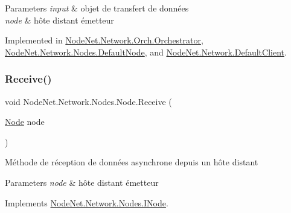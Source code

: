 \begin{DoxyParams}{Parameters}
{\em input} & objet de transfert de données\\
\hline
{\em node} & hôte distant émetteur\\
\hline
\end{DoxyParams}


Implemented in \hyperlink{class_node_net_1_1_network_1_1_orch_1_1_orchestrator_a1868c3dad9eb8763a7aaae1ef15862ed}{Node\+Net.\+Network.\+Orch.\+Orchestrator}, \hyperlink{class_node_net_1_1_network_1_1_nodes_1_1_default_node_abfabd743e94b2a4eabd9ccd17562fb57}{Node\+Net.\+Network.\+Nodes.\+Default\+Node}, and \hyperlink{class_node_net_1_1_network_1_1_default_client_a2f6688da612c04b54a102a21401e4d5b}{Node\+Net.\+Network.\+Default\+Client}.

\mbox{\label{class_node_net_1_1_network_1_1_nodes_1_1_node_abbeae4cb15af4c3a2608f71c317cb701}} 
\subsubsection{\texorpdfstring{Receive()}{Receive()}}
{\footnotesize\ttfamily void Node\+Net.\+Network.\+Nodes.\+Node.\+Receive (\begin{DoxyParamCaption}\item[{\hyperlink{class_node_net_1_1_network_1_1_nodes_1_1_node}{Node}}]{node }\end{DoxyParamCaption})}



Méthode de réception de données asynchrone depuis un hôte distant 


\begin{DoxyParams}{Parameters}
{\em node} & hôte distant émetteur\\
\hline
\end{DoxyParams}


Implements \hyperlink{interface_node_net_1_1_network_1_1_nodes_1_1_i_node_a8d325bc9a6e86d1cfd697692c603f7fb}{Node\+Net.\+Network.\+Nodes.\+I\+Node}.

\mbox{\label{class_node_net_1_1_network_1_1_nodes_1_1_node_ae0c6ccdbbcc7dbc30b4a30b63e878365}} 
